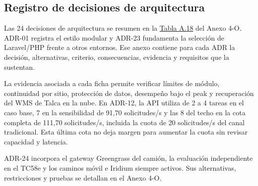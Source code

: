 \subsection{Registro de decisiones de arquitectura}
\label{sec:adr}

Las 24 decisiones de arquitectura se resumen en la \href{LAFROX-Subdocumento4-Anexos.pdf#tab:resumen-adr}{Tabla A.18} del Anexo 4-O. ADR-01 registra el estilo modular y ADR-23 fundamenta la selección de Laravel/PHP frente a otros entornos. Ese anexo contiene para cada ADR la decisión, alternativas, criterio, consecuencias, evidencia y requisitos que la sustentan.

La evidencia asociada a cada ficha permite verificar límites de módulo, continuidad por sitio, protección de datos, desempeño bajo el peak y recuperación del WMS de Talca en la nube. En ADR-12, la API utiliza de 2 a 4 tareas en el caso base, 7 en la sensibilidad de 91,70 solicitudes/s y las 8 del techo en la cota completa de 111,70 solicitudes/s, incluida la cuota de 20 solicitudes/s del canal tradicional. Esta última cota no deja margen para aumentar la cuota sin revisar capacidad y latencia.

ADR-24 incorpora el gateway Greengrass del camión, la evaluación independiente en el TC58e y los caminos móvil e Iridium siempre activos. Sus alternativas, restricciones y pruebas se detallan en el Anexo 4-O.
